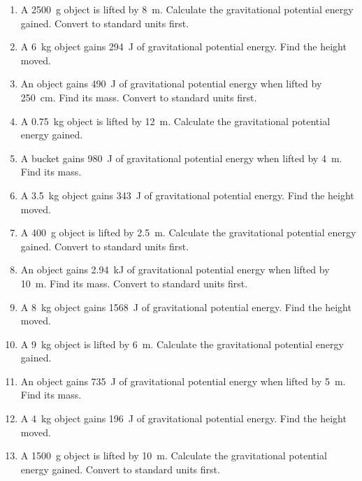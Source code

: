 \documentclass[12pt]{article}
\begin{document}
\begin{enumerate}[itemsep=1.2em]
\item A \SI{2500}{\gram} object is lifted by \SI{8}{\metre}.  
Calculate the gravitational potential energy gained. Convert to standard units first.

\item A \SI{6}{\kilogram} object gains \SI{294}{\joule} of gravitational potential energy.  
Find the height moved.

\item An object gains \SI{490}{\joule} of gravitational potential energy when lifted by \SI{250}{\centi\metre}.  
Find its mass. Convert to standard units first.

\item A \SI{0.75}{\kilogram} object is lifted by \SI{12}{\metre}.  
Calculate the gravitational potential energy gained.

\item A bucket gains \SI{980}{\joule} of gravitational potential energy when lifted by \SI{4}{\metre}.  
Find its mass.

\item A \SI{3.5}{\kilogram} object gains \SI{343}{\joule} of gravitational potential energy.  
Find the height moved.

\item A \SI{400}{\gram} object is lifted by \SI{2.5}{\metre}.  
Calculate the gravitational potential energy gained. Convert to standard units first.

\item An object gains \SI{2.94}{\kilo\joule} of gravitational potential energy when lifted by \SI{10}{\metre}.  
Find its mass. Convert to standard units first.

\item A \SI{8}{\kilogram} object gains \SI{1568}{\joule} of gravitational potential energy.  
Find the height moved.

\item A \SI{9}{\kilogram} object is lifted by \SI{6}{\metre}.  
Calculate the gravitational potential energy gained.

\item An object gains \SI{735}{\joule} of gravitational potential energy when lifted by \SI{5}{\metre}.  
Find its mass.

\item A \SI{4}{\kilogram} object gains \SI{196}{\joule} of gravitational potential energy.  
Find the height moved.

\item A \SI{1500}{\gram} object is lifted by \SI{10}{\metre}.  
Calculate the gravitational potential energy gained. Convert to standard units first.


\end{enumerate}
\end{document}
